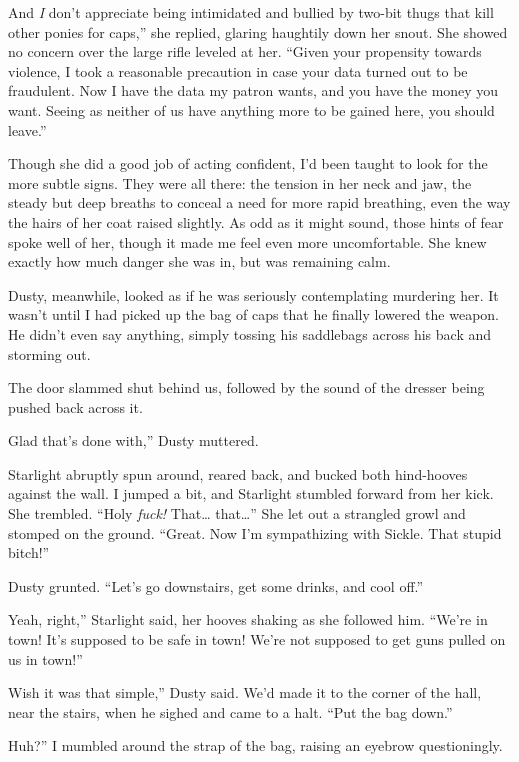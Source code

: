 \leavevmode{}And \textit{I} don’t appreciate being intimidated and bullied by two-bit thugs that kill other ponies for caps,” she replied, glaring haughtily down her snout. She showed no concern over the large rifle leveled at her. “Given your propensity towards violence, I took a reasonable precaution in case your data turned out to be fraudulent. Now I have the data my patron wants, and you have the money you want. Seeing as neither of us have anything more to be gained here, you should leave.”

Though she did a good job of acting confident, I’d been taught to look for the more subtle signs. They were all there: the tension in her neck and jaw, the steady but deep breaths to conceal a need for more rapid breathing, even the way the hairs of her coat raised slightly. As odd as it might sound, those hints of fear spoke well of her, though it made me feel even more uncomfortable. She knew exactly how much danger she was in, but was remaining calm.

Dusty, meanwhile, looked as if he was seriously contemplating murdering her. It wasn’t until I had picked up the bag of caps that he finally lowered the weapon. He didn’t even say anything, simply tossing his saddlebags across his back and storming out.

The door slammed shut behind us, followed by the sound of the dresser being pushed back across it.

\leavevmode{}Glad that’s done with,” Dusty muttered.

Starlight abruptly spun around, reared back, and bucked both hind-hooves against the wall. I jumped a bit, and Starlight stumbled forward from her kick. She trembled. “Holy \textit{fuck!} That… that…” She let out a strangled growl and stomped on the ground. “Great. Now I’m sympathizing with Sickle. That stupid bitch!”

Dusty grunted. “Let’s go downstairs, get some drinks, and cool off.”

\leavevmode{}Yeah, right,” Starlight said, her hooves shaking as she followed him. “We’re in town! It’s supposed to be safe in town! We’re not supposed to get guns pulled on us in town!”

\leavevmode{}Wish it was that simple,” Dusty said. We’d made it to the corner of the hall, near the stairs, when he sighed and came to a halt. “Put the bag down.”

\leavevmode{}Huh?” I mumbled around the strap of the bag, raising an eyebrow questioningly.

